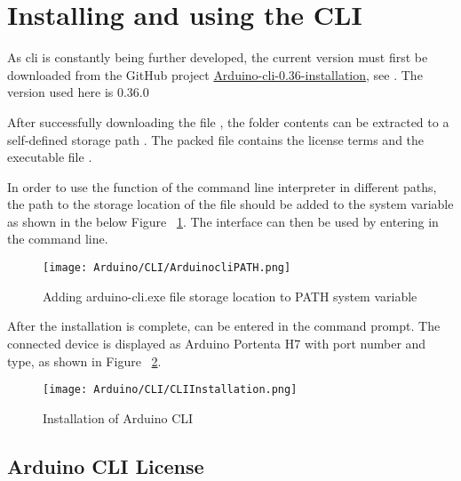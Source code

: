 \section {Installing and using the CLI}
As \ac{cli} is constantly being further developed, the current version must first be downloaded from the GitHub project \href{https://arduino.github.io/arduino-cli/0.36/installation/}{Arduino-cli-0.36-installation}, see \cite{ArduinoCLIGit:2024}. The version used here is 0.36.0 \cite{ArduinoCLIversion:2024}

\bigskip

After successfully downloading the file , the folder contents can be extracted to a self-defined storage path . The packed file contains the license terms and the executable file . 

In order to use the function of the command line interpreter in different paths, the path  to the storage location of the file  should be added to the system variable  as shown in the below Figure ~\ref{Path}. The interface can then be used by entering  in the command line.

\begin{figure}
	\begin{center}
		\texttt{[image: Arduino/CLI/ArduinocliPATH.png]}
		\caption{Adding arduino-cli.exe file storage location to PATH system variable}
		\label{Path}
	\end{center}
\end{figure}


After the installation is complete,  can be entered in the command prompt. The connected device is displayed as Arduino Portenta H7 with port number and type, as shown in Figure ~\ref{Installation}.  

\begin{figure}
	\begin{center}
		\texttt{[image: Arduino/CLI/CLIInstallation.png]}
		\caption{Installation of Arduino CLI}
		\label{Installation}
	\end{center}
\end{figure}

\subsection{Arduino CLI License}

